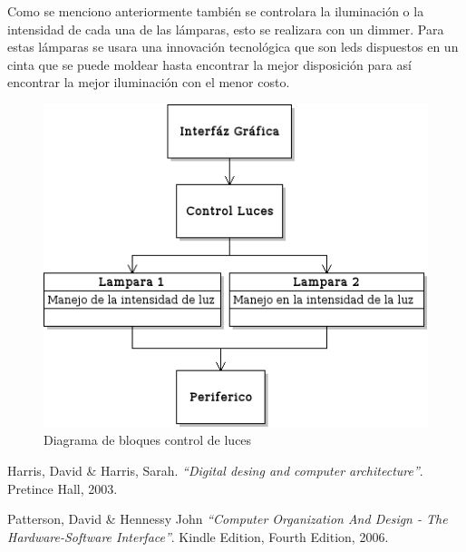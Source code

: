 \documentclass[twocolumn]{IEEEtran}
\begin{document}
Como se menciono anteriormente también se controlara la iluminación o la intensidad de cada una de las lámparas, esto se realizara con un dimmer. Para estas lámparas se usara una innovación tecnológica que son leds dispuestos en un cinta que se puede moldear hasta encontrar la mejor disposición para así encontrar la mejor iluminación con el menor costo. 
\begin{figure}[H]
	\centering
		\includegraphics[scale=0.6]{dia3.png}
	\caption{Diagrama de bloques control de luces}
	\label{fig5}
\end{figure}



\begin{thebibliography}{99}
 Harris, David \& Harris, Sarah.
{\em "`Digital desing and computer architecture"'}.
Pretince Hall, 2003.

 Patterson, David \& Hennessy John
{\em "`Computer Organization And Design - The Hardware-Software Interface"'}.
Kindle Edition, Fourth Edition, 2006.

\end{thebibliography}
\end{document}
